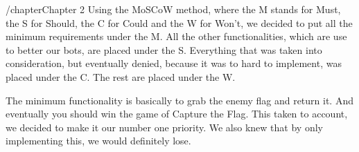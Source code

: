 /chapter{Chapter 2}
Using the MoSCoW method, where the M stands for Must, the S for Should, the C for Could and the W for Won't, we decided to put all the minimum requirements under the M. All the other functionalities, which are use to better our bots, are placed under the S. Everything that was taken into consideration, but eventually denied, because it was to hard to implement, was placed under the C. The rest are placed under the W.

The minimum functionality is basically to grab the enemy flag and return it. And eventually you should win the game of Capture the Flag. This taken to account, we decided to make it our number one priority. We also knew that by only implementing this, we would definitely lose. 